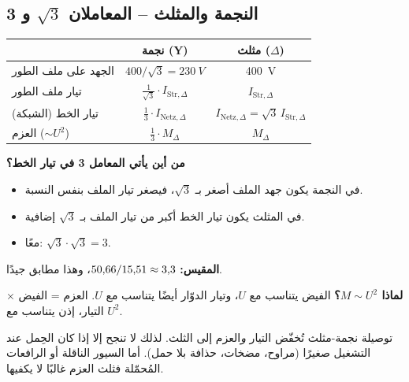 \documentclass[11pt,a4paper]{article}
\newcommand{\dt}[1]{\textgerman{#1}}
\begin{document}
\subsection{النجمة والمثلث – المعاملان \texorpdfstring{$\sqrt3$}{جذر 3} و 3}
\begin{center}
\begin{tabular}{@{}lcc@{}}
\toprule
& نجمة \dt{(Y)} & مثلث \dt{($\Delta$)}\\
\midrule
الجهد على ملف الطور & $400/\sqrt3 = \SI{230}{V}$ & \SI{400}{V}\\
تيار ملف الطور & $\frac{1}{\sqrt3}\cdot I_{\mathrm{Str},\Delta}$ & $I_{\mathrm{Str},\Delta}$\\
تيار الخط (الشبكة) & $\frac13\cdot I_{\mathrm{Netz},\Delta}$ & $I_{\mathrm{Netz},\Delta} = \sqrt3\,I_{\mathrm{Str},\Delta}$\\
العزم ($\sim U^2$) & $\frac13\cdot M_\Delta$ & $M_\Delta$\\
\bottomrule
\end{tabular}
\end{center}
\textbf{من أين يأتي المعامل 3 في تيار الخط؟}
\begin{itemize}
\item في النجمة يكون جهد الملف أصغر بـ $\sqrt3$، فيصغر تيار الملف بنفس النسبة.
\item في المثلث يكون تيار الخط أكبر من تيار الملف بـ $\sqrt3$ إضافية.
\item معًا: $\sqrt3\cdot\sqrt3 = 3$.
\end{itemize}
\textbf{المقيس:} $50{,}66/15{,}51\approx 3{,}3$، وهذا مطابق جيدًا.

\textbf{لماذا $M\sim U^2$؟} الفيض يتناسب مع $U$، وتيار الدوّار أيضًا يتناسب مع $U$.
العزم = الفيض × التيار، إذن يتناسب مع $U^2$.

\begin{merke}
توصيلة نجمة-مثلث تُخفّض التيار \emph{و}العزم إلى الثلث. لذلك لا تنجح إلا إذا كان الحِمل عند
التشغيل صغيرًا (مراوح، مضخات، حذافة بلا حمل). أما السيور الناقلة أو الرافعات المُحمّلة فثلث العزم
غالبًا لا يكفيها.
\end{merke}
\end{document}
